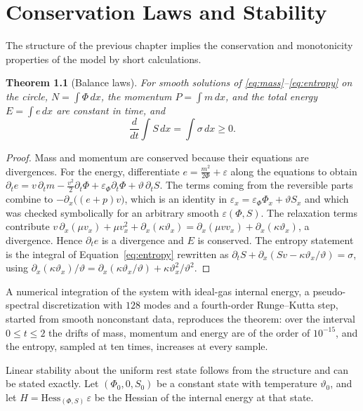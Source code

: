 \documentclass[11pt,oneside]{book}
\newtheorem{theorem}{Theorem}[chapter]
\theoremstyle{definition}
\theoremstyle{remark}
\begin{document}
\chapter{Conservation Laws and Stability}\label{ch:stability}

The structure of the previous chapter implies the conservation and monotonicity properties of the model by short calculations.

\begin{theorem}[Balance laws]\label{thm:balance}
For smooth solutions of \eqref{eq:mass}--\eqref{eq:entropy} on the circle, $N=\int\Phi\,dx$, the momentum $P=\int m\,dx$, and the total energy $E=\int e\,dx$ are constant in time, and
\[
\frac{d}{dt}\int S\,dx=\int\sigma\,dx\geq0 .
\]
\end{theorem}

\begin{proof}
Mass and momentum are conserved because their equations are divergences. For the energy, differentiate $e=\tfrac{m^2}{2\Phi}+\varepsilon$ along the equations to obtain $\partial_te=v\,\partial_tm-\tfrac{v^2}2\partial_t\Phi+\varepsilon_\Phi\partial_t\Phi+\vartheta\,\partial_tS$. The terms coming from the reversible parts combine to $-\partial_x\bigl((e+p)v\bigr)$, which is an identity in $\varepsilon_x=\varepsilon_\Phi\Phi_x+\vartheta S_x$ and which was checked symbolically for an arbitrary smooth $\varepsilon(\Phi,S)$. The relaxation terms contribute $v\,\partial_x(\mu v_x)+\mu v_x^2+\partial_x(\kappa\vartheta_x)=\partial_x(\mu vv_x)+\partial_x(\kappa\vartheta_x)$, a divergence. Hence $\partial_te$ is a divergence and $E$ is conserved. The entropy statement is the integral of Equation~\eqref{eq:entropy} rewritten as $\partial_tS+\partial_x(Sv-\kappa\vartheta_x/\vartheta)=\sigma$, using $\partial_x(\kappa\vartheta_x)/\vartheta=\partial_x(\kappa\vartheta_x/\vartheta)+\kappa\vartheta_x^2/\vartheta^2$.
\end{proof}

A numerical integration of the system with ideal-gas internal energy, a pseudo-spectral discretization with $128$ modes and a fourth-order Runge--Kutta step, started from smooth nonconstant data, reproduces the theorem: over the interval $0\le t\le2$ the drifts of mass, momentum and energy are of the order of $10^{-15}$, and the entropy, sampled at ten times, increases at every sample.

Linear stability about the uniform rest state follows from the structure and can be stated exactly. Let $(\Phi_0,0,S_0)$ be a constant state with temperature $\vartheta_0$, and let $H=\mathrm{Hess}_{(\Phi,S)}\,\varepsilon$ be the Hessian of the internal energy at that state.
\end{document}
